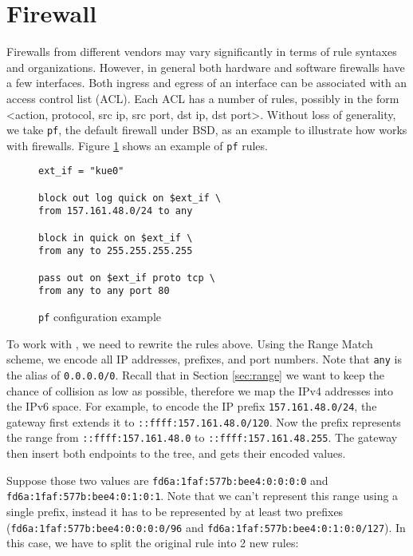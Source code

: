 
\section{Firewall}\label{sec:firewall}

Firewalls from different vendors may vary significantly in terms of rule syntaxes and organizations. However,
in general both hardware and software firewalls have a few interfaces. Both ingress and egress of an interface 
can be associated with an access control list (ACL). Each ACL has a number of rules, possibly in the form 
<action, protocol, src ip, src port, dst ip, dst port>. Without loss of generality, we take \texttt{pf}, the 
default firewall under BSD, as an example to illustrate how \sys works with firewalls. Figure \ref{fig:fwrule1} 
shows an example of \texttt{pf} rules. 

\begin{figure}[h]\label{fig:fwrule1}
\begin{lstlisting}[frame=single]
ext_if = "kue0"

block out log quick on $ext_if \
from 157.161.48.0/24 to any

block in quick on $ext_if \
from any to 255.255.255.255

pass out on $ext_if proto tcp \
from any to any port 80
\end{lstlisting}
\caption{\texttt{pf} configuration example}
\end{figure}

To work with \sys, we need to rewrite the rules above. Using the Range Match scheme, we encode all IP addresses, 
prefixes, and port numbers. Note that \texttt{any} is the alias of \texttt{0.0.0.0/0}. Recall that in Section \ref{sec:range}
we want to keep the chance of collision as low as possible, therefore we map the IPv4 addresses into the IPv6 space.
For example, to encode the IP prefix \texttt{157.161.48.0/24}, the gateway first extends it to \texttt{::ffff:157.161.48.0/120}.
Now the prefix represents the range from \texttt{::ffff:157.161.48.0} to \texttt{::ffff:157.161.48.255}. The gateway then insert
both endpoints to the tree, and gets their encoded values. 

Suppose those two values are \texttt{fd6a:1faf:577b:bee4:0:0:0:0} and
\texttt{fd6a:1faf:577b:bee4:0:1:0:1}. Note that we can't represent this range using a single prefix, instead it has to be 
represented by at least two prefixes (\texttt{fd6a:1faf:577b:bee4:0:0:0:0/96} and \texttt{fd6a:1faf:577b:bee4:0:1:0:0/127}).
In this case, we have to split the original rule into 2 new rules:

